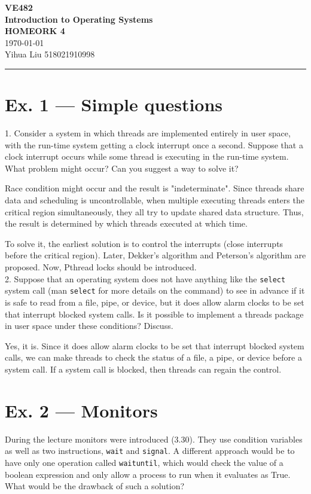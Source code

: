 \documentclass[a4paper]{article}
\begin{document}
\begin{center}
    \huge
    \textbf{VE482\\Introduction to Operating Systems\\}
    \Large
    \vspace{15pt}
    \uppercase{\textbf{Homeork 4}}\\
    \large
    \vspace{5pt}\today\\
    \vspace{5pt}
    Yihua Liu 518021910998
    \vspace{5pt}
    \rule[-5pt]{.97\linewidth}{0.05em}
\end{center}
\section*{Ex. 1 — Simple questions}
1. Consider a system in which threads are implemented entirely in user space, with the run-time system getting a clock interrupt once a second. Suppose that a clock interrupt occurs while some thread is executing in the run-time system. What problem might occur? Can you suggest a way to solve it?

Race condition might occur and the result is "indeterminate". Since threads share data and scheduling is uncontrollable, when multiple executing threads enters the critical region simultaneously, they all try to update shared data structure. Thus, the result is determined by which threads executed at which time.

To solve it, the earliest solution is to control the interrupts (close interrupts before the critical region). Later, Dekker's algorithm and Peterson's algorithm are proposed. Now, Pthread locks should be introduced.\\
2. Suppose that an operating system does not have anything like the \texttt{select} system call (man \texttt{select} for more details on the command) to see in advance if it is safe to read from a file, pipe, or device, but it does allow alarm clocks to be set that interrupt blocked system calls. Is it possible to implement a threads package in user space under these conditions? Discuss.

Yes, it is. Since it does allow alarm clocks to be set that interrupt blocked system calls, we can make threads to check the status of a file, a pipe, or device before a system call. If a system call is blocked, then threads can regain the control.
\section*{Ex. 2 — Monitors}
During the lecture monitors were introduced (3.30). They use condition variables as well as two instructions, \texttt{wait} and \texttt{signal}. A different approach would be to have only one operation called \texttt{waituntil}, which would check the value of a boolean expression and only allow a process to run when it evaluates as True. What would be the drawback of such a solution?
\end{document}
